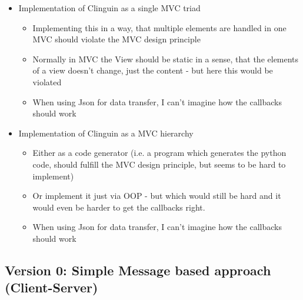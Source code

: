 \documentclass[12pt,a4paper]{article}
\newcommand{\<}[1]{\guilsinglleft}
\renewcommand{\>}[1]{\guilsinglright}
\begin{document}
\begin{itemize}
    \item Implementation of Clinguin as a single MVC triad
    \begin{itemize}
        \item Implementing this in a way, that multiple elements are handled in one MVC should violate the MVC design principle
        \item Normally in MVC the View should be static in a sense, that the elements of a view doesn't change, just the content - but here this would be violated
        \item When using Json for data transfer, I can't imagine how the callbacks should work
    \end{itemize}
    \item Implementation of Clinguin as a MVC hierarchy
    \begin{itemize}
        \item Either as a code generator (i.e. a program which generates the python code, should fulfill the MVC design principle, but seems to be hard to implement)
        \item Or implement it just via OOP - but which would still be hard and it would even be harder to get the callbacks right.
        \item When using Json for data transfer, I can't imagine how the callbacks should work
    \end{itemize}
\end{itemize}


\subsection{Version 0: Simple Message based approach (Client-Server)}
\label{subsubsec:client-server}
\end{document}
